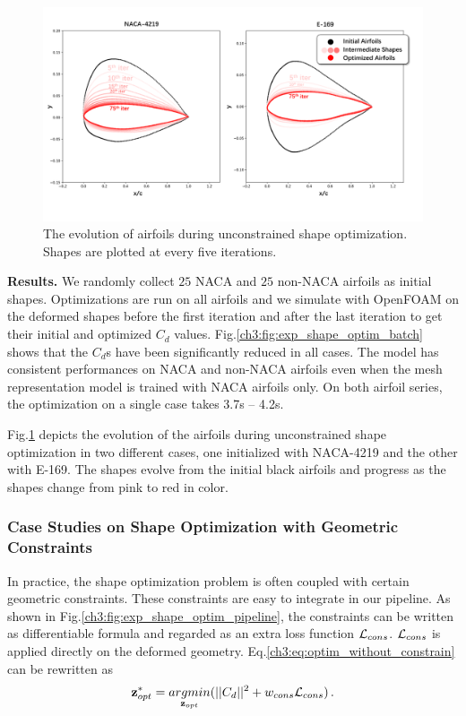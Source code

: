 \begin{figure}[htb]
	\begin{center}
		
        \vspace{-2mm}
        \includegraphics[width=0.9\linewidth]{chapter3/tex/figures/experiment/shape_optimization_batch_evolve.pdf}
	\end{center}

        \vspace{-2mm}
	\caption{ \small
		The evolution of airfoils during unconstrained shape optimization. Shapes are plotted at every five iterations.
	}
	\label{ch3:fig:optim_batch_evolve}
\end{figure}

\noindent \textbf{Results.}
We randomly collect $25$ NACA and $25$ non-NACA airfoils as initial shapes.
Optimizations are run on all airfoils and we simulate with OpenFOAM on the deformed shapes before the first iteration and after the last iteration to get their initial and optimized $C_d$ values.
Fig.\ref{ch3:fig:exp_shape_optim_batch} shows that the $C_d$s have been significantly reduced in all cases.
The model has consistent performances on NACA and non-NACA airfoils even when the mesh representation model is trained with NACA airfoils only.
On both airfoil series, the optimization on a single case takes 3.7s -- 4.2s.

Fig.\ref{ch3:fig:optim_batch_evolve} depicts the evolution of the airfoils during unconstrained shape optimization in two different cases, one initialized with NACA-4219 and the other with E-169. The shapes evolve from the initial black airfoils and progress as the shapes change from pink to red in color.

\subsubsection{Case Studies on Shape Optimization with Geometric Constraints}
In practice, the shape optimization problem is often coupled with certain geometric constraints.
These constraints are easy to integrate in our pipeline.
As shown in Fig.\ref{ch3:fig:exp_shape_optim_pipeline}, the constraints can be written as differentiable formula and regarded as an extra loss function $\mathcal{L}_{cons}$.
$\mathcal{L}_{cons}$ is applied directly on the deformed geometry. Eq.\ref{ch3:eq:optim_without_constrain} can be rewritten as
\begin{equation}
    \mathbf{z}_{opt}^* = \mathop{argmin}\limits_{\mathbf{z}_{opt}} ( ||C_d||^2 + w_{cons} \mathcal{L}_{cons} )\,.
\end{equation}

